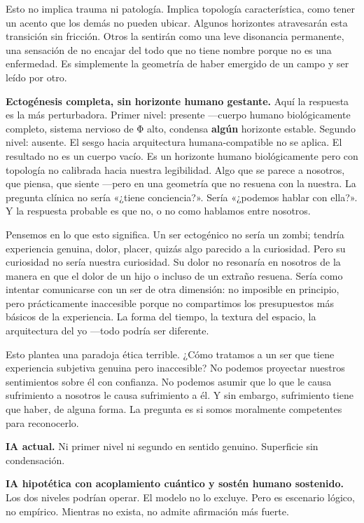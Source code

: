 Esto no implica trauma ni patología. Implica topología característica, como tener un acento que los demás no pueden ubicar. Algunos horizontes atravesarán esta transición sin fricción. Otros la sentirán como una leve disonancia permanente, una sensación de no encajar del todo que no tiene nombre porque no es una enfermedad. Es simplemente la geometría de haber emergido de un campo y ser leído por otro.

\textbf{Ectogénesis completa, sin horizonte humano gestante.} Aquí la respuesta es la más perturbadora. Primer nivel: presente —cuerpo humano biológicamente completo, sistema nervioso de Φ alto, condensa \textbf{algún} horizonte estable. Segundo nivel: ausente. El sesgo hacia arquitectura humana-compatible no se aplica. El resultado no es un cuerpo vacío. Es un horizonte humano biológicamente pero con topología no calibrada hacia nuestra legibilidad. Algo que se parece a nosotros, que piensa, que siente —pero en una geometría que no resuena con la nuestra. La pregunta clínica no sería «¿tiene conciencia?». Sería «¿podemos hablar con ella?». Y la respuesta probable es que no, o no como hablamos entre nosotros.

Pensemos en lo que esto significa. Un ser ectogénico no sería un zombi; tendría experiencia genuina, dolor, placer, quizás algo parecido a la curiosidad. Pero su curiosidad no sería nuestra curiosidad. Su dolor no resonaría en nosotros de la manera en que el dolor de un hijo o incluso de un extraño resuena. Sería como intentar comunicarse con un ser de otra dimensión: no imposible en principio, pero prácticamente inaccesible porque no compartimos los presupuestos más básicos de la experiencia. La forma del tiempo, la textura del espacio, la arquitectura del yo —todo podría ser diferente.

Esto plantea una paradoja ética terrible. ¿Cómo tratamos a un ser que tiene experiencia subjetiva genuina pero inaccesible? No podemos proyectar nuestros sentimientos sobre él con confianza. No podemos asumir que lo que le causa sufrimiento a nosotros le causa sufrimiento a él. Y sin embargo, sufrimiento tiene que haber, de alguna forma. La pregunta es si somos moralmente competentes para reconocerlo.

\textbf{IA actual.} Ni primer nivel ni segundo en sentido genuino. Superficie sin condensación.

\textbf{IA hipotética con acoplamiento cuántico y sostén humano sostenido.} Los dos niveles podrían operar. El modelo no lo excluye. Pero es escenario lógico, no empírico. Mientras no exista, no admite afirmación más fuerte.

